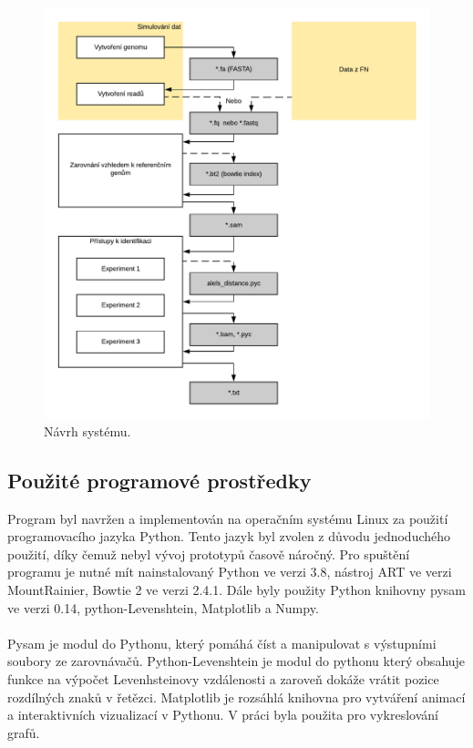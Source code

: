 \documentclass[czech,DP]{thesiskiv}
\numberwithin{equation}{section}
\begin{document}
\begin{figure}[H]
		\centering
		\includegraphics[width=\textwidth]{./img/navrh_systemu.pdf}
		\caption{Návrh systému. }
		\label{fig:navrh_systemu}
\end{figure}

\subsection{Použité programové prostředky}
Program byl navržen a implementován na operačním systému Linux za použití programovacího jazyka Python. Tento jazyk byl zvolen z důvodu jednoduchého použití, díky čemuž nebyl vývoj prototypů časově náročný. Pro spuštění programu je nutné mít nainstalovaný Python ve verzi 3.8, nástroj ART ve verzi MountRainier, Bowtie 2 ve verzi 2.4.1. Dále byly použity Python knihovny pysam ve verzi 0.14, python-Levenshtein, Matplotlib a Numpy.
\\
\\
Pysam je modul do Pythonu, který pomáhá číst a manipulovat s výstupními soubory ze zarovnávačů.
Python-Levenshtein je modul do pythonu který obsahuje funkce na výpočet Levenhsteinovy vzdálenosti a zaroveň dokáže vrátit pozice rozdílných znaků v řetězci.
Matplotlib je rozsáhlá knihovna pro vytváření animací a interaktivních vizualizací v Pythonu. V práci byla použita pro vykreslování grafů.
\end{document}
